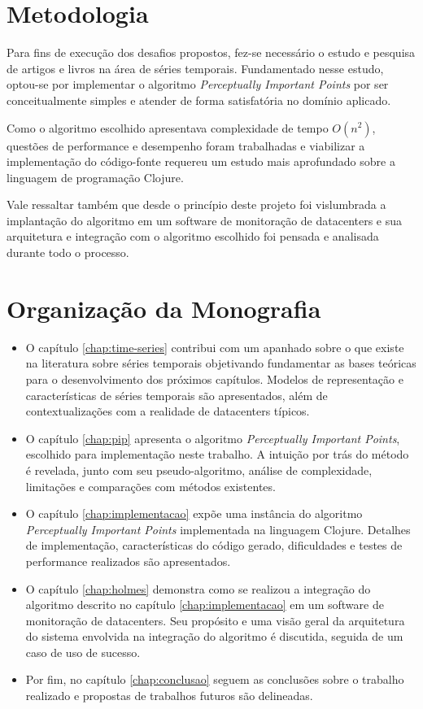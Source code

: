\section{Metodologia}
Para fins de execução dos desafios propostos, fez-se necessário o estudo e pesquisa de artigos e livros na área de séries temporais. Fundamentado nesse estudo, optou-se por implementar o algoritmo \textit{Perceptually Important Points} por ser conceitualmente simples e atender de forma satisfatória no domínio aplicado.

Como o algoritmo escolhido apresentava complexidade de tempo $O(n^2)$, questões de performance e desempenho foram trabalhadas e viabilizar a implementação do código-fonte requereu um estudo mais aprofundado sobre a linguagem de programação Clojure. 

Vale ressaltar também que desde o princípio deste projeto foi vislumbrada a implantação do algoritmo em um software de monitoração de datacenters e sua arquitetura e integração com o algoritmo escolhido foi pensada e analisada durante todo o processo.

\section{Organização da Monografia}

\begin{itemize}

\item O capítulo \ref{chap:time-series} contribui com um apanhado sobre o que existe na literatura sobre séries temporais objetivando fundamentar as bases teóricas para o desenvolvimento dos próximos capítulos. Modelos de representação e características de séries temporais são apresentados, além de contextualizações com a realidade de datacenters típicos.

\item O capítulo \ref{chap:pip} apresenta o algoritmo \textit{Perceptually Important Points}, escolhido para implementação neste trabalho. A intuição por trás do método é revelada, junto com seu pseudo-algoritmo, análise de complexidade, limitações e comparações com métodos existentes.

\item O capítulo \ref{chap:implementacao} expõe uma instância do algoritmo \textit{Perceptually Important Points} implementada na linguagem Clojure. Detalhes de implementação, características do código gerado, dificuldades e testes de performance realizados são apresentados.

\item O capítulo \ref{chap:holmes} demonstra como se realizou a integração do algoritmo descrito no capítulo \ref{chap:implementacao} em um software de monitoração de datacenters. Seu propósito e uma visão geral da arquitetura do sistema envolvida na integração do algoritmo é discutida, seguida de um caso de uso de sucesso.

\item Por fim, no capítulo \ref{chap:conclusao} seguem as conclusões sobre o trabalho realizado e propostas de trabalhos futuros são delineadas.
\end{itemize}

